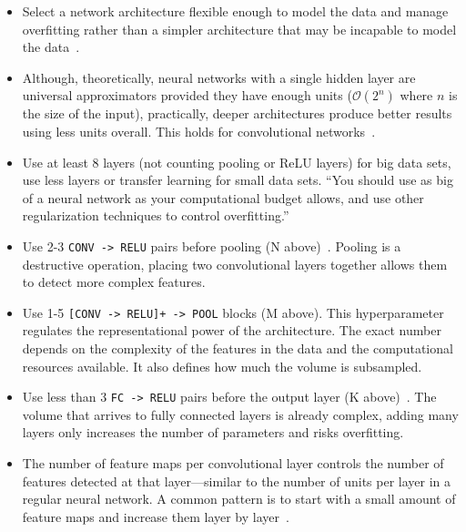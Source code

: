 \begin{itemize}
	\item Select a network architecture flexible enough to model the data and manage overfitting rather than a simpler architecture that may be incapable to model the data~\cite{Ng2014, Krizhevsky2012}. 

	\item Although, theoretically, neural networks with a single hidden layer are universal approximators provided they have enough units ($\mathcal{O}(2^n)$ where $n$ is the size of the input), practically, deeper architectures produce better results using less units overall. This holds for convolutional networks~\cite{Bengio2014}.

	\item Use at least 8 layers (not counting pooling or ReLU layers) for big data sets, use less layers or transfer learning for small data sets. ``You should use as big of a neural network as your computational budget allows, and use other regularization techniques to control overfitting.''~\cite{Karpathy2015}

	\item Use 2-3 \texttt{CONV -> RELU} pairs before pooling (N above)~\cite{Karpathy2015}. Pooling is a destructive operation, placing two convolutional layers together allows them to detect more complex features.

	\item Use 1-5 \texttt{[CONV -> RELU]+ -> POOL} blocks (M above). This hyperparameter regulates the representational power of the architecture. The exact number depends on the complexity of the features in the data and the computational resources available. It also defines how much the volume is subsampled.

	\item Use less than 3 \texttt{FC -> RELU} pairs before the output layer (K above)~\cite{Karpathy2015}. The volume that arrives to fully connected layers is already complex, adding many layers only increases the number of parameters and risks overfitting.

	\item The number of feature maps per convolutional layer controls the number of features detected at that layer---similar to the number of units per layer in a regular neural network. A common pattern is to start with a small amount of feature maps and increase them layer by layer~\cite{Simonyan2014}. %


\end{itemize}
